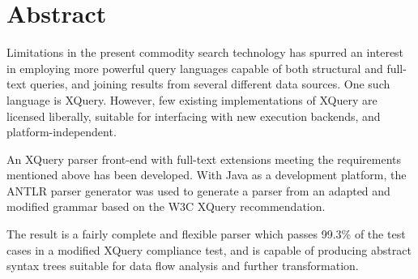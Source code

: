 \chapter*{Abstract}
Limitations in the present commodity search technology has spurred
an interest in employing more powerful query languages capable of both
structural and full-text queries, and joining results from several different data
sources. One such language is XQuery. However, few existing implementations of
XQuery are licensed liberally, suitable for interfacing with new execution
backends, and platform-independent. 

An XQuery parser front-end with full-text extensions meeting the requirements
mentioned above has been developed. With Java as a development platform, the
ANTLR parser generator was used to generate a parser from an adapted and
modified grammar based on the W3C XQuery recommendation. 

The result is a fairly complete and flexible parser which passes
99.3\% of the test cases in a modified XQuery compliance test, and is capable of
producing abstract syntax trees suitable for data flow analysis and further 
transformation.